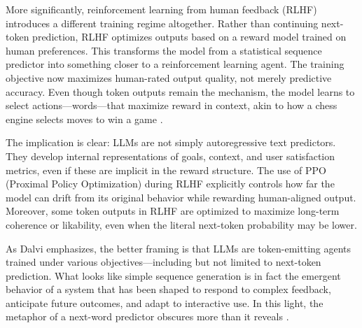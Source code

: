 More significantly, reinforcement learning from human feedback (RLHF) introduces a different training regime altogether. Rather than continuing next-token prediction, RLHF optimizes outputs based on a reward model trained on human preferences. This transforms the model from a statistical sequence predictor into something closer to a reinforcement learning agent. The training objective now maximizes human-rated output quality, not merely predictive accuracy. Even though token outputs remain the mechanism, the model learns to select actions—words—that maximize reward in context, akin to how a chess engine selects moves to win a game \parencite{dalvi2025}.

The implication is clear: LLMs are not simply autoregressive text predictors. They develop internal representations of goals, context, and user satisfaction metrics, even if these are implicit in the reward structure. The use of PPO (Proximal Policy Optimization) during RLHF explicitly controls how far the model can drift from its original behavior while rewarding human-aligned output. Moreover, some token outputs in RLHF are optimized to maximize long-term coherence or likability, even when the literal next-token probability may be lower.

As Dalvi emphasizes, the better framing is that LLMs are token-emitting agents trained under various objectives—including but not limited to next-token prediction. What looks like simple sequence generation is in fact the emergent behavior of a system that has been shaped to respond to complex feedback, anticipate future outcomes, and adapt to interactive use. In this light, the metaphor of a next-word predictor obscures more than it reveals \parencite{dalvi2025}.



